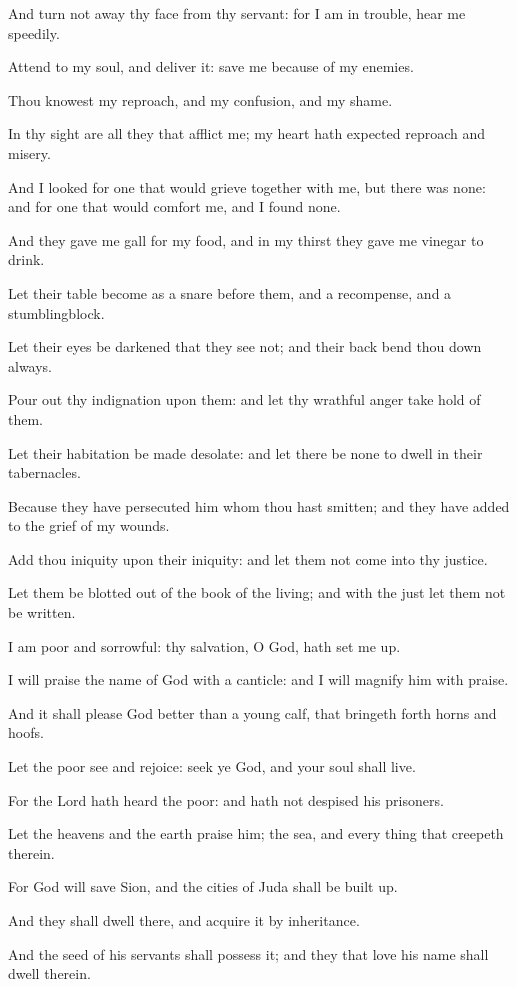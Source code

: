 \item And turn not away thy face from thy servant: for I am in trouble, hear me speedily.
\item Attend to my soul, and deliver it: save me because of my enemies.
\item Thou knowest my reproach, and my confusion, and my shame.
\item In thy sight are all they that afflict me; my heart hath expected reproach and misery.
\item And I looked for one that would grieve together with me, but there was none: and for one that would comfort me, and I found none.
\item And they gave me gall for my food, and in my thirst they gave me vinegar to drink.
\item Let their table become as a snare before them, and a recompense, and a stumblingblock.
\item Let their eyes be darkened that they see not; and their back bend thou down always.
\item Pour out thy indignation upon them: and let thy wrathful anger take hold of them.
\item Let their habitation be made desolate: and let there be none to dwell in their tabernacles.
\item Because they have persecuted him whom thou hast smitten; and they have added to the grief of my wounds.
\item Add thou iniquity upon their iniquity: and let them not come into thy justice.
\item Let them be blotted out of the book of the living; and with the just let them not be written.
\item I am poor and sorrowful: thy salvation, O God, hath set me up.
\item I will praise the name of God with a canticle: and I will magnify him with praise.
\item And it shall please God better than a young calf, that bringeth forth horns and hoofs.
\item Let the poor see and rejoice: seek ye God, and your soul shall live.\ifx\enlinebreakafterthirtyseven\undefined\else\\\fi
\item For the Lord hath heard the poor: and hath not despised his prisoners.
\item Let the heavens and the earth praise him; the sea, and every thing that creepeth therein.
\item For God will save Sion, and the cities of Juda shall be built up.
\item And they shall dwell there, and acquire it by inheritance.
\item And the seed of his servants shall possess it; and they that love his name shall dwell therein.